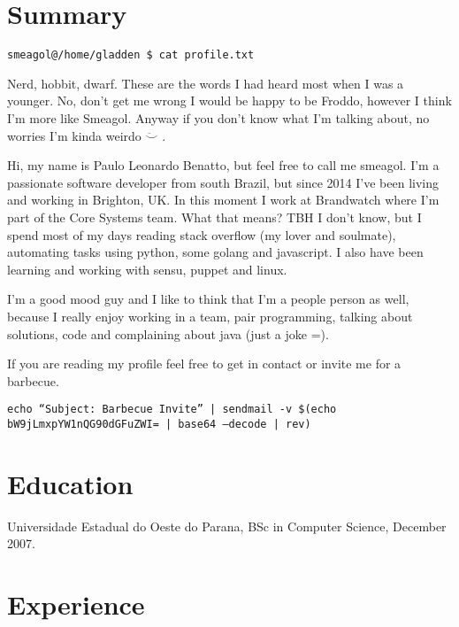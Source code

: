 \documentclass[margin]{res}
\begin{document}
  

\address{Brighton, UK \\ benatto@gmail.com \\ Phone: +44 07533998484 \\ Post Code: BN1 6AQ }

                        
\begin{resume}                        

\section{Summary} \texttt{smeagol@/home/gladden \$ cat profile.txt}

Nerd, hobbit, dwarf. These are the words I had heard most when I was a younger.
No, don't get me wrong I would be happy to be Froddo, however I think I'm more
like Smeagol. Anyway if you don't know what I'm talking about, no worries
I'm kinda weirdo $\ddot\smile$ .

Hi, my name is Paulo Leonardo Benatto, but feel free to call me smeagol.
I'm a passionate software developer from south Brazil, but since 2014 I've been
living and working in Brighton, UK. In this moment I work at Brandwatch where
I'm part of the Core Systems team. What that means? TBH I don't know, but I spend
most of my days reading stack overflow (my lover and soulmate), automating
tasks using python, some golang and javascript. I also have been learning and
working with sensu, puppet and linux.

I'm a good mood guy and I like to think that I'm a people person as well,
because I really enjoy working in a team, pair programming, talking about
solutions, code and complaining about java (just a joke =).

If you are reading my profile feel free to get in contact or invite me for a barbecue.

\texttt{echo ``Subject: Barbecue Invite'' | sendmail -v \$(echo bW9jLmxpYW1nQG90dGFuZWI= | base64 --decode | rev)}

\section{Education}	Universidade Estadual do Oeste do Parana, BSc in Computer Science, December 2007.
  
\section{Experience}


\end{resume}
\end{document}
